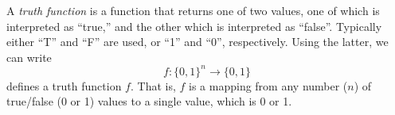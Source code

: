 \documentclass[12pt]{article}
\begin{document}
A \emph{truth function} is a function that returns one of two values, one of which is interpreted as ``true,'' and the other which is interpreted as ``false''.  Typically either ``T'' and ``F'' are used, or ``1'' and ``0'', respectively.  Using the latter, we can write $$f : \{0,1\}^n \rightarrow \{0,1\}$$
defines a truth function $f$. That is, $f$ is a mapping from any number ($n$) of true/false (0 or 1) values to a single value, which is 0 or 1.
\end{document}
